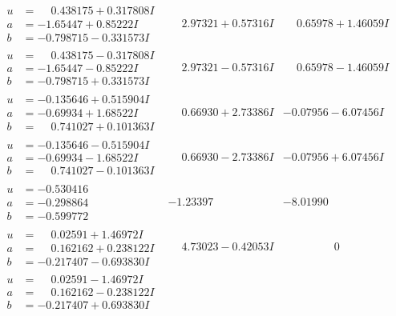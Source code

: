 \documentclass[1p]{elsarticle_modified}
\theoremstyle{definition}
\begin{document}
$$\begin{array}{c|c|c}
\begin{aligned}
u &= \phantom{-}0.438175 + 0.317808 I \\
a &= -1.65447 + 0.85222 I \\
b &= -0.798715 - 0.331573 I\end{aligned}
 & \phantom{-}2.97321 + 0.57316 I & \phantom{-}0.65978 + 1.46059 I \\ \hline\begin{aligned}
u &= \phantom{-}0.438175 - 0.317808 I \\
a &= -1.65447 - 0.85222 I \\
b &= -0.798715 + 0.331573 I\end{aligned}
 & \phantom{-}2.97321 - 0.57316 I & \phantom{-}0.65978 - 1.46059 I \\ \hline\begin{aligned}
u &= -0.135646 + 0.515904 I \\
a &= -0.69934 + 1.68522 I \\
b &= \phantom{-}0.741027 + 0.101363 I\end{aligned}
 & \phantom{-}0.66930 + 2.73386 I & -0.07956 - 6.07456 I \\ \hline\begin{aligned}
u &= -0.135646 - 0.515904 I \\
a &= -0.69934 - 1.68522 I \\
b &= \phantom{-}0.741027 - 0.101363 I\end{aligned}
 & \phantom{-}0.66930 - 2.73386 I & -0.07956 + 6.07456 I \\ \hline\begin{aligned}
u &= -0.530416\phantom{ +0.000000I} \\
a &= -0.298864\phantom{ +0.000000I} \\
b &= -0.599772\phantom{ +0.000000I}\end{aligned}
 & -1.23397\phantom{ +0.000000I} & -8.01990\phantom{ +0.000000I} \\ \hline\begin{aligned}
u &= \phantom{-}0.02591 + 1.46972 I \\
a &= \phantom{-}0.162162 + 0.238122 I \\
b &= -0.217407 - 0.693830 I\end{aligned}
 & \phantom{-}4.73023 - 0.42053 I & \phantom{-0.000000 } 0 \\ \hline\begin{aligned}
u &= \phantom{-}0.02591 - 1.46972 I \\
a &= \phantom{-}0.162162 - 0.238122 I \\
b &= -0.217407 + 0.693830 I\end{aligned}

\end{array}$$
\end{document}
